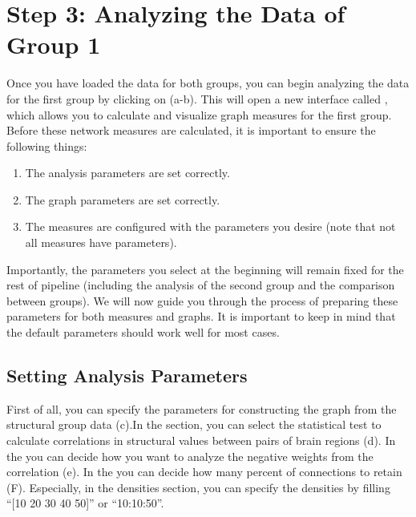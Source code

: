 \documentclass[justified]{tufte-handout}
\begin{document}
\section{Step 3: Analyzing the Data of Group 1}
 

Once you have loaded the data for both groups, you can begin analyzing the data for the first group by clicking on  (a-b). 
This will open a new interface called , which allows you to calculate and visualize graph measures for the first group. 
Before these network measures are calculated, it is important to ensure the following things: 
\begin{enumerate}
	\item The analysis parameters are set correctly.
	\item The graph parameters are set correctly.
	\item The measures are configured with the parameters you desire (note that not all measures have parameters).
\end{enumerate}

Importantly, the parameters you select at the beginning will remain fixed for the rest of pipeline (including the analysis of the second group and the comparison between groups). We will now guide you through the process of preparing these parameters for both measures and graphs. It is important to keep in mind that the default parameters should work well for most cases.

\subsection{Setting Analysis Parameters}


First of all, you can specify the parameters for constructing the graph from the structural group data (c).In the  section, you can select the statistical test to calculate correlations in structural values between pairs of brain regions (d).
In the  you can decide how you want to analyze the negative weights from the correlation (e). 
In the  you can decide how many percent of connections to retain (F). Especially, in the densities section, you can specify the densities by filling “[10 20 30 40 50]” or “10:10:50”.
\end{document}
